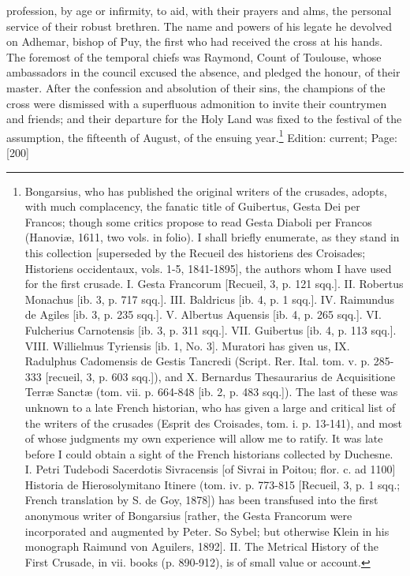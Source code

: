 profession, by age or infirmity, to aid, with their prayers and alms, the personal service of their robust brethren. The name and powers of his legate he devolved on Adhemar, bishop of Puy, the first who had received the cross at his hands. The foremost of the temporal chiefs was Raymond, Count of Toulouse, whose ambassadors in the council excused the absence, and pledged the honour, of their master. After the confession and absolution of their sins, the champions of the cross were dismissed with a superfluous admonition to invite their countrymen and friends; and their departure for the Holy Land was fixed to the festival of the assumption, the fifteenth of August, of the ensuing year.\footnote{Bongarsius, who has published the original writers of the crusades, adopts, with much complacency, the fanatic title of Guibertus, Gesta Dei per Francos; though some critics propose to read Gesta Diaboli per Francos (Hanoviæ, 1611, two vols. in folio). I shall briefly enumerate, as they stand in this collection [superseded by the Recueil des historiens des Croisades; Historiens occidentaux, vols. 1-5, 1841-1895], the authors whom I have used for the first crusade. I. Gesta Francorum [Recueil, 3, p. 121 sqq.]. II. Robertus Monachus [ib. 3, p. 717 sqq.]. III. Baldricus [ib. 4, p. 1 sqq.]. IV. Raimundus de Agiles [ib. 3, p. 235 sqq.]. V. Albertus Aquensis [ib. 4, p. 265 sqq.]. VI. Fulcherius Carnotensis [ib. 3, p. 311 sqq.]. VII. Guibertus [ib. 4, p. 113 sqq.]. VIII. Willielmus Tyriensis [ib. 1, No. 3]. Muratori has given us, IX. Radulphus Cadomensis de Gestis Tancredi (Script. Rer. Ital. tom. v. p. 285-333 [recueil, 3, p. 603 sqq.]), and X. Bernardus Thesaurarius de Acquisitione Terræ Sanctæ (tom. vii. p. 664-848 [ib. 2, p. 483 sqq.]). The last of these was unknown to a late French historian, who has given a large and critical list of the writers of the crusades (Esprit des Croisades, tom. i. p. 13-141), and most of whose judgments my own experience will allow me to ratify. It was late before I could obtain a sight of the French historians collected by Duchesne. I. Petri Tudebodi Sacerdotis Sivracensis [of Sivrai in Poitou; flor. c. ad 1100] Historia de Hierosolymitano Itinere (tom. iv. p. 773-815 [Recueil, 3, p. 1 sqq.; French translation by S. de Goy, 1878]) has been transfused into the first anonymous writer of Bongarsius [rather, the Gesta Francorum were incorporated and augmented by Peter. So Sybel; but otherwise Klein in his monograph Raimund von Aguilers, 1892]. II. The Metrical History of the First Crusade, in vii. books (p. 890-912), is of small value or account.}
Edition: current; Page: [200]

